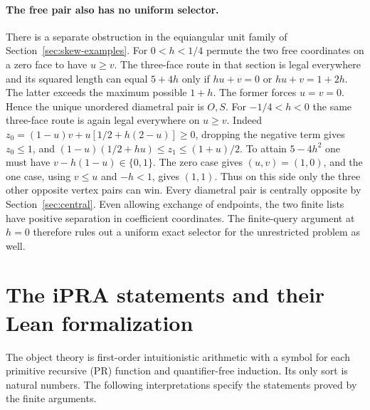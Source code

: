 \documentclass[10pt,letterpaper]{article}
\begin{document}
\paragraph{The free pair also has no uniform selector.}
There is a separate obstruction in the equiangular unit family of
Section~\ref{sec:skew-examples}. For $0<h<1/4$ permute the two
free coordinates on a zero face to have $u\ge v$. The three-face
route in that section is legal everywhere and its squared length
can equal $5+4h$ only if $hu+v=0$ or $hu+v=1+2h$. The latter exceeds
the maximum possible $1+h$. The former forces $u=v=0$. Hence the
unique unordered diametral pair is $O,S$. For $-1/4<h<0$ the same
three-face route is again legal everywhere on $u\ge v$. Indeed
$z_0=(1-u)v+u[1/2+h(2-u)]\ge0$, dropping the negative term gives
$z_0\le1$, and $(1-u)(1/2+hu)\le z_1\le(1+u)/2$.
To attain $5-4h^2$ one must have $v-h(1-u)\in\{0,1\}$. The zero
case gives $(u,v)=(1,0)$, and the one case, using $v\le u$ and
$-h<1$, gives $(1,1)$. Thus on this side only the three other opposite
vertex pairs can win. Every diametral pair is centrally opposite by
Section~\ref{sec:central}. Even allowing exchange of endpoints, the
two finite lists have positive separation in coefficient coordinates.
The finite-query argument at $h=0$ therefore rules out a uniform
exact selector for the unrestricted problem as well.

\section{The iPRA statements and their Lean formalization}\label{sec:lean}
The object theory is first-order intuitionistic arithmetic with a
symbol for each primitive recursive (PR) function and quantifier-free
induction. Its only sort is natural numbers. The following
interpretations specify the statements proved by the finite arguments.
\end{document}
